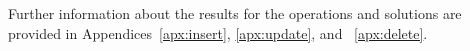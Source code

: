 Further information about the results for the operations and solutions are
provided in Appendices~\ref{apx:insert},  \ref{apx:update},  and
~\ref{apx:delete}. 


%  

% 
% 
% 
% 
% 
% 

